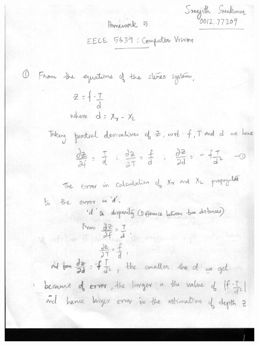 \documentclass{article}
\begin{document}

\begin{figure}
\includegraphics[width=15cm]{1_new_1.jpg}
\end{figure}
\end{document}
